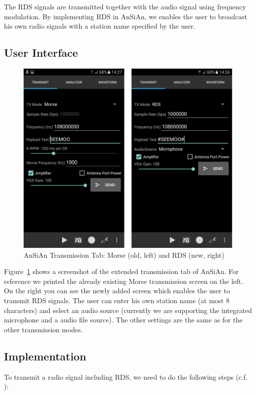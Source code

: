 The RDS signals are transmitted together with the audio signal using frequency modulation. By implementing RDS in AnSiAn, we enables the user to broadcast his own radio signals with a station name specified by the user. 

\subsection{User Interface}
\begin{figure}
	\centering
	\includegraphics[width=1.0\linewidth]{gfx/screenshot_rds.png}
	\caption{AnSiAn Transmission Tab: Morse (old, left) and RDS (new, right)}
	\label{fig:impl:screenshotrds}
\end{figure}


Figure~\ref{fig:impl:screenshotrds} shows a screenshot of the extended transmission tab of AnSiAn. For reference we printed the already existing Morse transmission screen on the left. On the right you can see the newly added screen which enables the user to transmit RDS signals. The user can enter his own station name (at most 8 characters) and select an audio source (currently we are supporting the integrated microphone and a audio file source). The other settings are the same as for the other transmission modes. 


\subsection{Implementation}
To transmit a radio signal including RDS, we need to do the following steps (c.f. \cite{RDS1999}):

